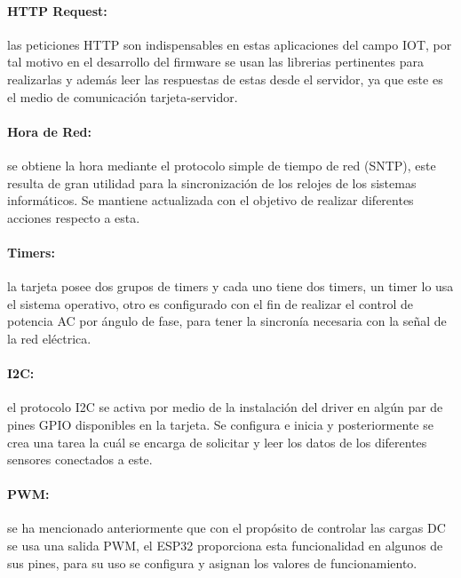 \paragraph{HTTP Request:}

las peticiones HTTP son indispensables en estas aplicaciones del campo IOT, por tal motivo en el desarrollo del firmware se usan las librerias pertinentes para realizarlas y además leer las respuestas de estas desde el servidor, ya que este es el medio de comunicación tarjeta-servidor.

\paragraph{Hora de Red:}

se obtiene la hora mediante el protocolo simple de tiempo de red (SNTP), este resulta de gran utilidad para la sincronización de los relojes de los sistemas informáticos. Se mantiene actualizada con el objetivo de realizar diferentes acciones respecto a esta.

\paragraph{Timers:}

la tarjeta posee dos grupos de timers y cada uno tiene dos timers, un timer lo usa el sistema operativo, otro es configurado con el fin de realizar el control de potencia AC por ángulo de fase, para tener la sincronía necesaria con la señal de la red eléctrica.

\paragraph{I2C:}

el protocolo I2C se activa por medio de la instalación del driver en algún par de pines GPIO disponibles en la tarjeta. Se configura e inicia y posteriormente se crea una tarea la cuál se encarga de solicitar y leer los datos de los diferentes sensores conectados a este.

\paragraph{PWM:}

se ha mencionado anteriormente que con el propósito de controlar las cargas DC se usa una salida PWM, el ESP32 proporciona esta funcionalidad en algunos de sus pines, para su uso se configura y asignan los valores de funcionamiento.


